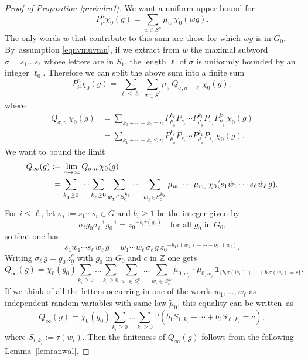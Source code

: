 \documentclass[JEP,XML,SOM,Unicode]{cedram}
\theoremstyle{definition}
\newcommand{\m}[1]{\mathbb{ #1}}
\let\si\sigma
\let\ra\to
\begin{document}
\begin{proof}[Proof of Proposition \ref{proindra1}]
We want a uniform upper bound for
\[
P^n_\mu\chi_0(g)
=
\sum_{w\in S^n}\mu_w\,\chi_0(\dot{w}g).
\]
The only words $w$ that contribute to this sum are those for which
$\dot{w}g$ is in $G_0$.
By~assumption \eqref{eqnvmuvmu},
if we extract from $w$ the maximal subword $\si=s_1\ldots s_\ell$
whose letters are in $S_1$, the length $\ell$ of $\si$ is uniformly bounded
by an integer $\ell_0$.
Therefore we can split the above sum into a finite sum
\[
P^n_\mu\chi_0(g)
=
\sum_{\ell\leq \ell_0}\sum_{\si\in S_{_1}^\ell}
\mu_\si\,Q_{\si,n-\ell}\,\chi_0(g),
\]
where
\begin{equation}
\label{eqnqsinch}
\begin{aligned}
Q_{\si,n}\,\chi_0(g)
&=
\sum_{k_0+\cdots +k_\ell=n}
P^{k_\ell}_{\mu_{_0}}P_{s_{_\ell}}\cdots
P^{k_1}_{\mu_{_0}}P_{s_{_1}}P^{k_0}_{\mu_{_0}}\,\chi_0(g)\\
&=
\sum_{k_1+\cdots +k_\ell\leq n}
P^{k_\ell}_{\mu_{_0}}P_{s_{_\ell}}\cdots
P^{k_1}_{\mu_{_0}}P_{s_{_1}}\,\chi_0(g).
\end{aligned}
\end{equation}
We want to bound the limit
\begin{equation}
\label{eqnqsiinf}
\begin{aligned}
Q_\infty(g)
&:=
\lim_{n\ra\infty}
Q_{\si,n}\,\chi_0(g)\\
&\hphantom{:}=
\sum_{k_{_1}\geq 0}\cdots\sum_{k_{_\ell}\geq 0}
\sum_{w_{_1}\in S^{k_1}_{_0}}\cdots\sum_{w_{_\ell}\in S^{k_\ell}_{_0}}
\mu_{w_{_1}}\cdots\mu_{w_{_\ell}}\,\chi_0(s_1\dot{w}_{1}\cdots s_\ell\, \dot{w}_{\ell}\, g).
\end{aligned}
\end{equation}
For $i\leq \ell$, let $\si_i:=s_1\cdots s_i\in G$ and $b_i\geq 1$ be the integer given by
\[
\si_ig_0\si_i^{-1}g_0^{-1}={z_0}^{-b_i\tau(g_0)}
\quad\text{for all $g_0$ in $G_0$,}
\]
so that one has
\begin{equation}
\label{eqnswswg}
s_1\dot{w}_{1}\cdots s_\ell\, \dot{w}_{\ell}\, g
=
\dot{w}_{1}\cdots \dot{w}_{\ell}\,\si_\ell\, g\, {z_0}^{-b_1\tau(\dot{w}_1)-\cdots -b_\ell\tau(\dot{w}_\ell)}.
\end{equation}
Writing $\si_\ell\, g=g_0\,z_0^{c}$ with $g_0$ in $G_0$ and $c$ in $\m Z$
one gets
\[
Q_\infty(g)
=\chi_0(g_0)\sum_{k_{_1}\geq 0}\ldots\sum_{k_{_\ell}\geq 0}
\sum_{w_{_1}\in S^{k_1}_{_0}}\ldots\sum_{w_{_\ell}\in S^{k_\ell}_{_0}}
\widetilde{\mu}_{0,w_{_1}}\cdots\widetilde{\mu}_{0,w_{_\ell}}\,
\mathbf{1}_{\{b_1\tau(\dot{w}_1)+\cdots +b_\ell\tau(\dot{w}_\ell)=c\}}.
\]
If we think of all the letters occurring in one of the words $w_1,\ldots, w_\ell$
as independent random variables with same law $\widetilde{\mu}_0$,
this equality can be written~as
\[
\label{eqnqinf3}
Q_\infty(g)
=\chi_0(g_0)
\sum_{k_{_1}\geq 0}\ldots\sum_{k_{_\ell}\geq 0}
\m P(b_1S_{1,k_{_1}}+\cdots +b_\ell S_{\ell,k_{_\ell}}=c),
\]
where $S_{i,k_{_i}}:=\tau(\dot{w}_i)$.
Then the finiteness of $Q_\infty(g)$ follows from the following
Lemma~\ref{lemranwal}.
\end{proof}
\end{document}
